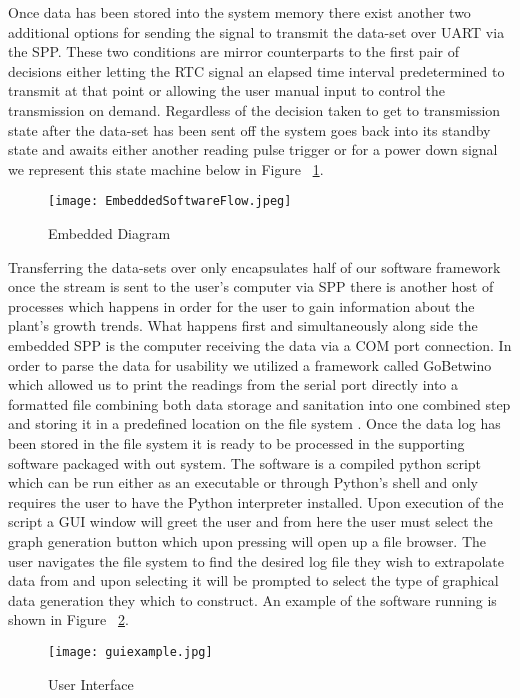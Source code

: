\documentclass[comsoc, 12pt]{IEEEtran}
\begin{document}
Once data has been stored into the system memory there exist another two additional options for sending the signal to transmit the data-set over UART via the SPP. These two conditions are mirror counterparts to the first pair of decisions either letting the RTC signal an elapsed time interval predetermined to transmit at that point or allowing the user manual input to control the transmission on demand. Regardless of the decision taken to get to transmission state after the data-set has been sent off the system goes back into its standby state and awaits either another reading pulse trigger or for a power down signal we represent this state machine below in Figure ~\ref{fig:embeddedflow}. \par
\begin{figure}[!h]
\centering
\texttt{[image: EmbeddedSoftwareFlow.jpeg]}
\centering
\caption{Embedded Diagram}
 \label{fig:embeddedflow}
\end{figure}
Transferring the data-sets over only encapsulates half of our software framework once the stream is sent to the user's computer via SPP there is another host of processes which happens in order for the user to gain information about the plant's growth trends. What happens first and simultaneously along side the embedded SPP is the computer receiving the data via a COM port connection. In order to parse the data for usability we utilized a framework called GoBetwino which allowed us to print the readings from the serial port directly into a formatted file combining both data storage and sanitation into one combined step and storing it in a predefined location on the file system \cite{WEBSITE:4}. Once the data log has been stored in the file system it is ready to be processed in the supporting software packaged with out system. The software is a compiled python script which can be run either as an executable or through Python's shell and only requires the user to have the Python interpreter installed. Upon execution of the script a GUI window will greet the user and from here the user must select the graph generation button which upon pressing will open up a file browser. The user navigates the file system to find the desired log file they wish to extrapolate data from and upon selecting it will be prompted to select the type of graphical data generation they which to construct. An example of the software running is shown in Figure ~\ref{fig:GUI}.
\begin{figure}[H]
\centering
\texttt{[image: guiexample.jpg]}
\centering
\caption{User Interface}
 \label{fig:GUI}
\end{figure}
\end{document}
